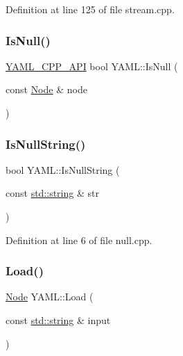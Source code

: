 Definition at line 125 of file stream.\+cpp.

\mbox{\label{namespace_y_a_m_l_a34cddbd9ea010c4144084854dc1870ad}} 
\subsubsection{\texorpdfstring{IsNull()}{IsNull()}}
{\footnotesize\ttfamily \mbox{\hyperlink{dll_8h_a70903db05b58f40db9aa4f966658fa65}{Y\+A\+M\+L\+\_\+\+C\+P\+P\+\_\+\+A\+PI}} bool Y\+A\+M\+L\+::\+Is\+Null (\begin{DoxyParamCaption}\item[{const \mbox{\hyperlink{class_y_a_m_l_1_1_node}{Node}} \&}]{node }\end{DoxyParamCaption})}

\mbox{\label{namespace_y_a_m_l_a46e9fa24850a3d1fec3b2035c47d22f3}} 
\subsubsection{\texorpdfstring{IsNullString()}{IsNullString()}}
{\footnotesize\ttfamily bool Y\+A\+M\+L\+::\+Is\+Null\+String (\begin{DoxyParamCaption}\item[{const \mbox{\hyperlink{glad_8h_ac83513893df92266f79a515488701770}{std\+::string}} \&}]{str }\end{DoxyParamCaption})}



Definition at line 6 of file null.\+cpp.

\mbox{\label{namespace_y_a_m_l_a45483b10f670351d6065b839b33a8de3}} 
\subsubsection{\texorpdfstring{Load()}{Load()}\hspace{0.1cm}{\footnotesize\ttfamily [1/3]}}
{\footnotesize\ttfamily \mbox{\hyperlink{class_y_a_m_l_1_1_node}{Node}} Y\+A\+M\+L\+::\+Load (\begin{DoxyParamCaption}\item[{const \mbox{\hyperlink{glad_8h_ac83513893df92266f79a515488701770}{std\+::string}} \&}]{input }\end{DoxyParamCaption})}

